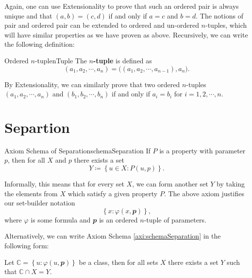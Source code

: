 \documentclass[math]{amznotes}
\theoremstyle{remark}
\begin{document}
Again, one can use Extensionality to prove that such an ordered pair is always unique and that $(a, b) = (c, d)$ if and only if $a = c$ and $b = d$. The notions of pair and ordered pair can be extended to ordered and un-ordered $n$-tuples, which will have similar properties as we have proven as above. Recursively, we can write the following definition:
\begin{dfnbox}{Ordered $n$-tuple}{nTuple}
    The {\color{red} \textbf{$n$-tuple}} is defined as 
    \begin{displaymath}
        (a_1, a_2, \cdots, a_n) = \bigl((a_1, a_2, \cdots, a_{n - 1}), a_n\bigr).
    \end{displaymath}
\end{dfnbox}
By Extensionality, we can similarly prove that two ordered $n$-tuples $(a_1, a_2, \cdots, a_n)$ and $(b_1, b_2, \cdots, b_n)$ if and only if $a_i = b_i$ for $i = 1, 2, \cdots, n$.
\section{Separtion}
\begin{axibox}{Axiom Schema of Separation}{schemaSeparation}
    If $P$ is a property with parameter $p$, then for all $X$ and $p$ there exists a set 
    \begin{displaymath}
        Y \coloneqq \left\{u \in X \colon P(u, p)\right\}.
    \end{displaymath}
\end{axibox}
Informally, this means that for every set $X$, we can form another set $Y$ by taking the elements from $X$ which satisfy a given property $P$. The above axiom justifies our set-builder notation
\begin{displaymath}
    \left\{x \colon \varphi(x, \mathbfit{p})\right\},
\end{displaymath}
where $\varphi$ is some formula and $\mathbfit{p}$ is an ordered $n$-tuple of parameters.

Alternatively, we can write Axiom Schema \ref{axi:schemaSeparation} in the following form:

    Let $\mathbb{C} = \left\{u \colon \varphi(u, \mathbfit{p})\right\}$ be a class, then for all sets $X$ there exists a set $Y$ such that $\mathbb{C} \cap X = Y$.
\end{document}

